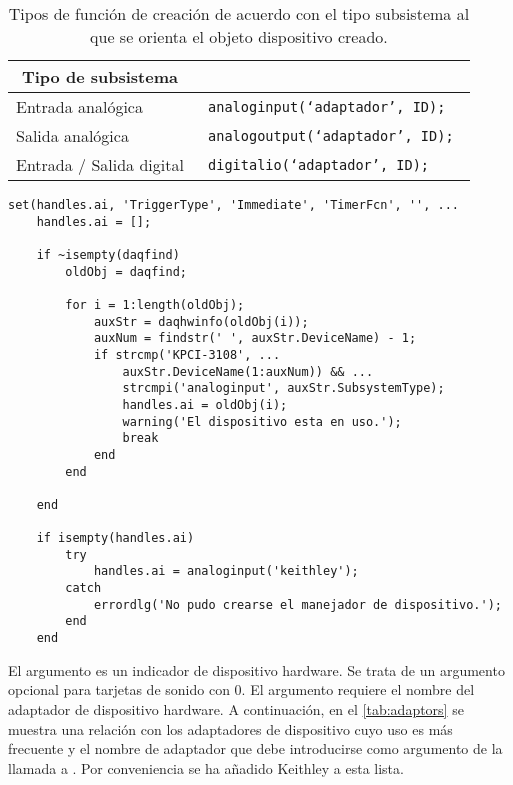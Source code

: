 \begin{table}
	\centering
	\begin{tabular}{l >{\tt}l}
		\toprule
		\multicolumn{1}{c}{Tipo de subsistema} %
		& \multicolumn{1}{c}{\rm Constructor} \\
		\midrule
		Entrada analógica & analoginput(`adaptador', ID); \\
		\midrule
		Salida analógica & analogoutput(`adaptador', ID); \\
		\midrule
		Entrada / Salida digital & digitalio(`adaptador', ID); \\
		\bottomrule
	\end{tabular}
	\caption[Tipos de constructor en función del objeto dispositivo
	creado]{Tipos de función de creación de acuerdo con el tipo
	subsistema al que se orienta el objeto dispositivo creado.}
	\label{tab:constructors}
\end{table}

\begin{lstlisting}[style=displayed, caption={[Método a seguir para crear un
	objeto dispositivo] {Método que evalúa la existencia de un objeto
	dispositivo previo a la llamada de la aplicación, en caso positivo
	lo hereda para su uso posterior, de lo contrario crea uno
	nuevo.}}, label={cod:constructor}]
	set(handles.ai, 'TriggerType', 'Immediate', 'TimerFcn', '', ...
	handles.ai = [];

	if ~isempty(daqfind)
		oldObj = daqfind;

		for i = 1:length(oldObj);
			auxStr = daqhwinfo(oldObj(i));
			auxNum = findstr(' ', auxStr.DeviceName) - 1;
			if strcmp('KPCI-3108', ...
				auxStr.DeviceName(1:auxNum)) && ...
				strcmpi('analoginput', auxStr.SubsystemType);
				handles.ai = oldObj(i);
				warning('El dispositivo esta en uso.');
				break
			end
		end

	end

	if isempty(handles.ai)
		try
			handles.ai = analoginput('keithley');
		catch
			errordlg('No pudo crearse el manejador de dispositivo.');
		end
	end
\end{lstlisting}

El argumento  es un indicador de dispositivo hardware. Se trata de
un argumento opcional para tarjetas de sonido con  0. El argumento
 requiere el nombre del adaptador de dispositivo hardware.
A continuación, en el \cref{tab:adaptors} se muestra una relación con los
adaptadores de dispositivo cuyo uso es más frecuente y el nombre de
adaptador que debe introducirse como argumento de la llamada a
. Por conveniencia se ha añadido Keithley a esta lista.

